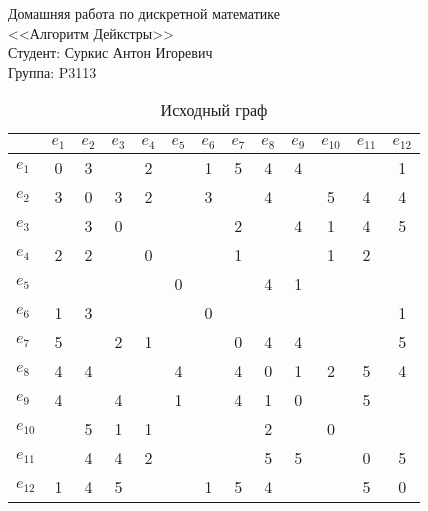 \documentclass[a4paper,12pt]{article}
\begin{document}
\pagestyle{fancy}
\fancyfoot{}

\noindent
Домашняя работа по дискретной математике \\
<<Алгоритм Дейкстры>> \\
Студент: Суркис Антон Игоревич \\
Группа: P3113

\begin{table}[H]
    \centering
    \caption{Исходный граф}
    \begin{tabular}{l*{3}{|cccc}}
        &$e_{1}$&$e_{2}$&$e_{3}$&$e_{4}$&$e_{5}$&$e_{6}$&$e_{7}$&$e_{8}$&$e_{9}$&$e_{10}$&$e_{11}$&$e_{12}$\\
        \hline
        $e_{1}$&0&3&&2&&1&5&4&4&&&1\\
        $e_{2}$&3&0&3&2&&3&&4&&5&4&4\\
        $e_{3}$&&3&0&&&&2&&4&1&4&5\\
        $e_{4}$&2&2&&0&&&1&&&1&2&\\
        \hline
        $e_{5}$&&&&&0&&&4&1&&&\\
        $e_{6}$&1&3&&&&0&&&&&&1\\
        $e_{7}$&5&&2&1&&&0&4&4&&&5\\
        $e_{8}$&4&4&&&4&&4&0&1&2&5&4\\
        \hline
        $e_{9}$&4&&4&&1&&4&1&0&&5&\\
        $e_{10}$&&5&1&1&&&&2&&0&&\\
        $e_{11}$&&4&4&2&&&&5&5&&0&5\\
        $e_{12}$&1&4&5&&&1&5&4&&&5&0\\
    \end{tabular}
\end{table}
\end{document}
